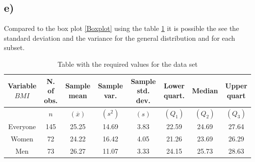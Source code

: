 \subsection{e)}
Compared to the box plot \ref{Boxplot} using the table \ref{Table1} it is possible the see the standard deviation and the variance for the general distribution and for each subset.\\ 
\begin{table}[h!]
\begin{tabular}{|c||c|c|c|c|c|c|c|}
  \hline
\parbox{1.5cm}{\textbf{Variable} $BMI$} & \textbf{N. of obs.} & \parbox{1.5cm}{\textbf{Sample mean}} & \parbox{1.5cm}{\textbf{Sample var.}} & \parbox{1.5cm}{\textbf{Sample std. dev.}} & \parbox{1.5cm}{\textbf{Lower quart.}} & \textbf{Median} & \parbox{1.5cm}{\textbf{Upper quart}} \\ 
 \hline
  & $n$ & $(\overline{x})$ & $(s^2)$ & $(s)$ & $(Q_1)$ & $(Q_2)$ & $(Q_3)$ \\
  \hline
  \hline
Everyone & 145 & 25.25 & 14.69 & 3.83 & 22.59 & 24.69 & 27.64 \\ 
  \hline
  Women &  72 & 24.22 & 16.42 & 4.05 & 21.26 & 23.69 & 26.29 \\ 
    \hline
  Men &  73 & 26.27 & 11.07 & 3.33 & 24.15 & 25.73 & 28.63 \\ 
   \hline
\end{tabular}
\caption{Table with the required values for the data set}
\label{Table1}
\end{table}
